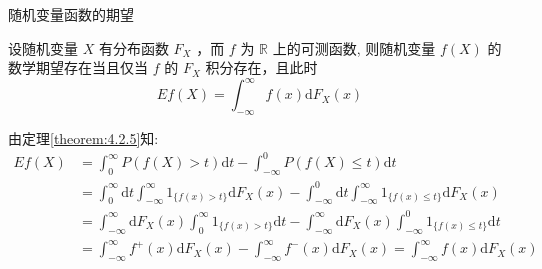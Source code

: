 \documentclass[Prob-All.tex]{subfiles}
\begin{document}
\begin{frame}{随机变量函数的期望}
\begin{thm}
设随机变量 $X$ 有分布函数 $F_{X}$ ，而 $f$ 为 $\mathbb{R}$ 上的可测函数, 则随机变量 $f(X)$ 的数学期望存在当且仅当 $f$ 的 $F_{X}$ 积分存在，且此时
\[
E f(X)=\int_{-\infty}^{\infty} f(x) \mathrm{d} F_{X}(x)
\]
\end{thm}
\pause
\zheng
由定理\ref{theorem:4.2.5}知:
\begin{align*}
E f(X)  &=\int_{0}^{\infty} P(f(X)>t) \mathrm{d} t-\int_{-\infty}^{0} P(f(X) \leqslant t) \mathrm{d} t \\
&=\int_{0}^{\infty} \mathrm{d} t \int_{-\infty}^{\infty} 1_{\{f(x)>t\}} \mathrm{d} F_{X}(x)-\int_{-\infty}^{0} \mathrm{d} t \int_{-\infty}^{\infty} 1_{\{f(x) \leqslant t\}} \mathrm{d} F_{X}(x)\\
&=\int_{-\infty}^{\infty} \mathrm{d} F_{X}(x) \int_{0}^{\infty} 1_{\{f(x)>t\}} \mathrm{d} t-\int_{-\infty}^{\infty} \mathrm{d} F_{X}(x) \int_{-\infty}^{0} 1_{\{f(x) \leqslant t\}} \mathrm{d} t \\
&
=\int_{-\infty}^{\infty} f^{+}(x) \mathrm{d} F_{X}(x)-\int_{-\infty}^{\infty} f^{-}(x) \mathrm{d} F_{X}(x)=\int_{-\infty}^{\infty} f(x) \mathrm{d} F_{X}(x)
\end{align*}

\end{frame}
\end{document}
